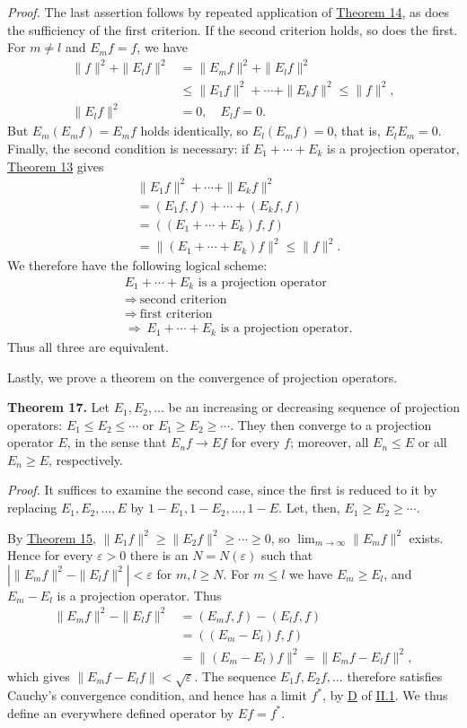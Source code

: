 \documentclass[fontsize=13pt,twoside,openany,headings=normal,parskip=false,bookmarkpackage=false,DIV=calc]{scrbook}
\begin{document}
\emph{Proof.} The last assertion follows by repeated application of \hyperref[thm:II.14]{Theorem 14}, as does the sufficiency of the first criterion. If the second criterion holds, so does the first. For $m\ne l$ and $E_mf=f$, we have
\begin{align*}
\|f\|^2+\|E_lf\|^2&=\|E_mf\|^2+\|E_lf\|^2\\
&\leq\|E_1f\|^2+\cdots+\|E_kf\|^2\leq\|f\|^2,\\
\|E_lf\|^2&=0,\quad E_lf=0.
\end{align*}
But $E_m(E_mf)=E_mf$ holds identically, so $E_l(E_mf)=0$, that is, $E_lE_m=0$. Finally, the second condition is necessary: if $E_1+\cdots+E_k$ is a projection operator, \hyperref[thm:II.13]{Theorem 13} gives
\begin{align*}
&\|E_1f\|^2+\cdots+\|E_kf\|^2\\
&=(E_1f,f)+\cdots+(E_kf,f)\\
&=((E_1+\cdots+E_k)f,f)\\
&=\|(E_1+\cdots+E_k)f\|^2\leq\|f\|^2.
\end{align*}
We therefore have the following logical scheme:
\begin{align*}
&
E_1+\cdots+E_k\text{ is a projection operator}\\
&\Longrightarrow\ \text{second criterion}\\
&\Longrightarrow\ \text{first criterion}\\
&\Longrightarrow\ E_1+\cdots+E_k\text{ is a projection operator}.
\end{align*}
Thus all three are equivalent.

Lastly, we prove a theorem on the convergence of projection operators.

\leavevmode{}\textbf{Theorem 17.}\label{thm:II.17} Let $E_1,E_2,\ldots$ be an increasing or decreasing sequence of projection operators: $E_1\leq E_2\leq\cdots$ or $E_1\geq E_2\geq\cdots$. They then converge to a projection operator $E$, in the sense that $E_nf\to Ef$ for every $f$; moreover, all $E_n\leq E$ or all $E_n\geq E$, respectively.

\emph{Proof.} It suffices to examine the second case, since the first is reduced to it by replacing $E_1,E_2,\ldots,E$ by $1-E_1,1-E_2,\ldots,1-E$. Let, then, $E_1\geq E_2\geq\cdots$.

By \hyperref[thm:II.15]{Theorem 15}, $\|E_1f\|^2\geq\|E_2f\|^2\geq\cdots\geq0$, so $\lim_{m\to\infty}\|E_mf\|^2$ exists. Hence for every $\varepsilon>0$ there is an $N=N(\varepsilon)$ such that $|\|E_mf\|^2-\|E_lf\|^2|<\varepsilon$ for $m,l\geq N$. For $m\leq l$ we have $E_m\geq E_l$, and $E_m-E_l$ is a projection operator. Thus
\begin{align*}
\|E_mf\|^2-\|E_lf\|^2&=(E_mf,f)-(E_lf,f)\\
&=((E_m-E_l)f,f)\\
&=\|(E_m-E_l)f\|^2=\|E_mf-E_lf\|^2,
\end{align*}
which gives $\|E_mf-E_lf\|<\sqrt\varepsilon$. The sequence $E_1f,E_2f,\ldots$ therefore satisfies Cauchy's convergence condition, and hence has a limit $f^*$, by \hyperref[ax:II.D]{D} of \hyperref[sec:II.1]{II.1}. We thus define an everywhere defined operator by $Ef=f^*$.
\end{document}
